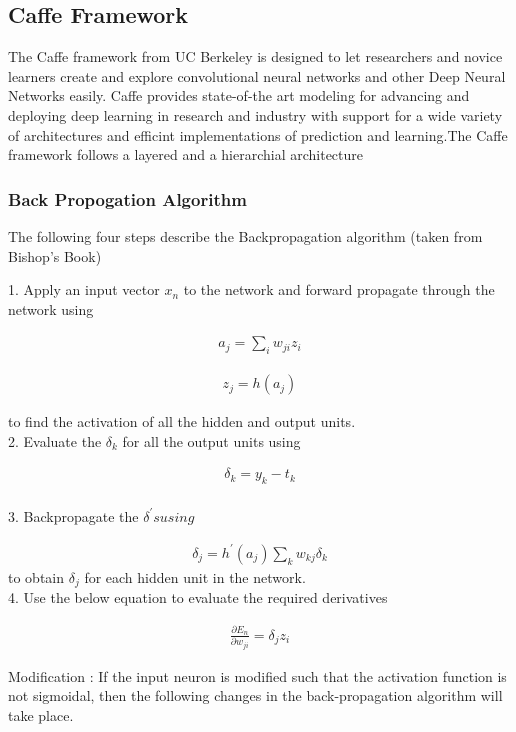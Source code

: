 \documentclass[conference]{IEEEtran}
\begin{document}
\subsection{Caffe Framework}
The Caffe framework \cite{caffe} from UC Berkeley is designed to let researchers and novice learners create and explore convolutional neural networks  and other Deep Neural Networks easily.
Caffe provides state-of-the art modeling for advancing and deploying deep learning in research and industry with support for a wide variety of architectures and efficint implementations of prediction and learning.The Caffe framework follows a layered and a hierarchial  architecture

\subsubsection{Back Propogation Algorithm}
The following four steps describe the Backpropagation algorithm (taken from Bishop's Book)

1. Apply an input vector $ x _{n}$ to the network and forward propagate through the network using  

\begin{align}
 a _{j} = \sum\limits_{i} w _{ji} z _{i}  
\end{align}


\begin{align}
  z_{j} = h(a_{j})
\end{align}

to find the activation of all the hidden and output units. \\
2. Evaluate the $\delta _{k}$ for all the output units using

\begin{align}
\delta _{k} = y_{k} - t_{k}
\end{align}
\\
3. Backpropagate the $\delta^{'} s using $ 

\begin{align}
 \delta _{j} = h^{'}(a_{j}) \sum\limits_{k} w_{kj} \delta_{k}
\end{align}
to obtain $ \delta_{j}$ for each hidden unit in the network.\\
4. Use the below equation to evaluate the required derivatives

\begin{align}
\frac{\partial E_{n}}{\partial w_{ji}} = \delta_{j} z_{i}
\end{align}

Modification : If the input neuron is modified such that the activation function is not sigmoidal, then the following changes in the back-propagation algorithm will take place.
\end{document}
